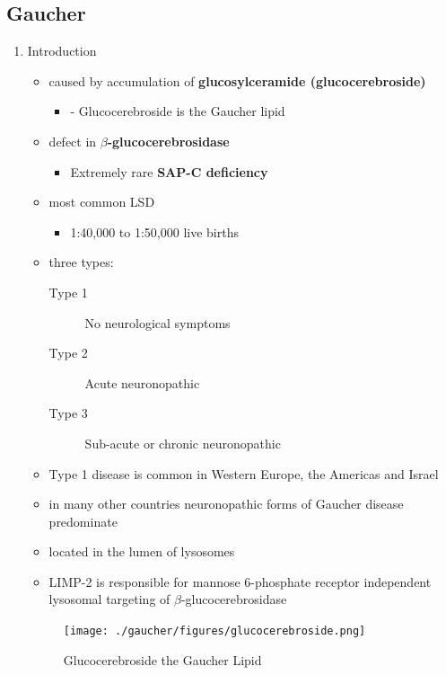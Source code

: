\documentclass{scrartcl}
\begin{document}
\subsection{Gaucher}
\label{sec:orgec14e19}
\begin{enumerate}
\item Introduction
\label{sec:orgab038ca}
\begin{itemize}
\item caused by accumulation of \textbf{glucosylceramide (glucocerebroside)}
\begin{itemize}
\item - Glucocerebroside is the Gaucher lipid
\end{itemize}
\item defect in \textbf{\(\beta\)-glucocerebrosidase}
\begin{itemize}
\item Extremely rare \textbf{SAP-C deficiency}
\end{itemize}
\item most common LSD
\begin{itemize}
\item 1:40,000 to 1:50,000 live births
\end{itemize}
\item three types:
\begin{description}
\item[{Type 1}] No neurological symptoms
\item[{Type 2}] Acute neuronopathic
\item[{Type 3}] Sub-acute or chronic neuronopathic
\end{description}
\item Type 1 disease is common in Western Europe, the Americas and Israel
\item in many other countries neuronopathic forms of Gaucher disease predominate
\end{itemize}


\begin{itemize}
\item located in the lumen of lysosomes
\item LIMP-2 is responsible for mannose 6-phosphate receptor independent
lysosomal targeting of \(\beta\)-glucocerebrosidase
\end{itemize}

\begin{figure}[htbp]
\centering
\texttt{[image: ./gaucher/figures/glucocerebroside.png]}
\caption{\label{fig:org4624a93}
Glucocerebroside the Gaucher Lipid}
\end{figure}


\end{enumerate}
\end{document}
